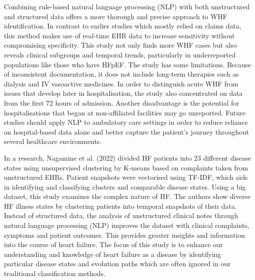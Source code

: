 Combining rule-based natural language processing (NLP) with both unstructured and structured data offers a more thorough and precise approach to WHF identification. In contrast to earlier studies which mostly relied on claims data, this method makes use of real-time EHR data to increase sensitivity without compromising specificity. This study not only finds more WHF cases but also reveals clinical subgroups and temporal trends, particularly in underreported populations like those who have HFpEF. The study has some limitations. Because of inconsistent documentation, it does not include long-term therapies such as dialysis and IV vasoactive medicines. In order to distinguish acute WHF from issues that develop later in hospitalisation, the study also concentrated on data from the first 72 hours of admission. Another disadvantage is the potential for hospitalisations that began at non-affiliated facilities may go unreported. Future studies should apply NLP to ambulatory care settings in order to reduce reliance on hospital-based data alone and better capture the patient's journey throughout several healthcare environments.
\vspace{0.5cm}

In a research, Nagamine et al. (2022) divided HF patients into 23 different disease states using unsupervised clustering by K-means based on complaints taken from unstructured EHRs. Patient snapshots were vectorised using TF-IDF, which aids in identifying and classifying clusters and comparable disease states. Using a big dataset, this study examines the complex nature of HF. The authors show diverse HF illness states by clustering patients into temporal snapshots of their data. Instead of structured data, the analysis of unstructured clinical notes through natural language processing (NLP) improves the dataset with clinical complaints, symptoms and patient outcomes. This provides greater insights and information into the course of heart failure. The focus of this study is to enhance our understanding and knowledge of heart failure as a disease by identifying particular disease states and evolution paths which are often ignored in our traditional classification methods.

\vspace{0.5cm}

